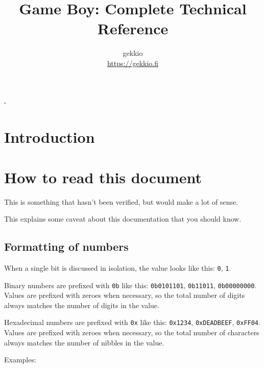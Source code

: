 \documentclass[a4paper, draft, oneside]{memoir}
\title{Game Boy: Complete Technical Reference}
\author{gekkio\\ \url{https://gekkio.fi}}
\newcommand{\bit}[1]{\texttt{#1}}
\newcommand{\bin}[1]{\texttt{0b#1}}
\newcommand{\hex}[1]{\texttt{0x#1}}
\begin{document}
\hypersetup{pageanchor=false}

\begin{titlingpage}
  \calccentering{\unitlength}
  \setlength{\droptitle}{80pt}
  \begin{adjustwidth*}{\unitlength}{-\unitlength}
    \maketitle
  \end{adjustwidth*}
\end{titlingpage}

\hypersetup{pageanchor=true}

\tableofcontents

\chapter*{Introduction}

\chapter*{How to read this document}

\begin{speculation}
  This is something that hasn't been verified, but would make a lot of sense.
\end{speculation}

\begin{caveat}
  This explains some caveat about this documentation that you should know.
\end{caveat}

\section{Formatting of numbers}

When a single bit is discussed in isolation, the value looks like this: \bit{0}, \bit{1}.

Binary numbers are prefixed with \bin{} like this: \bin{0101101}, \bin{11011}, \bin{00000000}. Values are prefixed with zeroes when necessary, so the total number of digits always matches the number of digits in the value.

Hexadecimal numbers are prefixed with \hex{} like this: \hex{1234}, \hex{DEADBEEF}, \hex{FF04}. Values are prefixed with zeroes when necessary, so the total number of characters always matches the number of nibbles in the value.

Examples:
\end{document}
